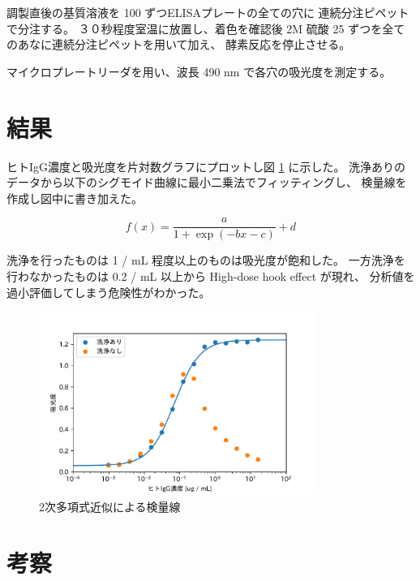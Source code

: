 \documentclass[a4paper]{ltjsarticle}
\begin{document}
調製直後の基質溶液を 100 \uL ずつELISAプレートの全ての穴に
連続分注ピペットで分注する。
３０秒程度室温に放置し、着色を確認後
2M 硫酸 25 \uL ずつを全てのあなに連続分注ピペットを用いて加え、
酵素反応を停止させる。

マイクロプレートリーダを用い、波長 490 nm で各穴の吸光度を測定する。


%
\section{結果}

ヒトIgG濃度と吸光度を片対数グラフにプロットし図 \ref{fig:a-kenryo} に示した。
洗浄ありのデータから以下のシグモイド曲線に最小二乗法でフィッティングし、
検量線を作成し図中に書き加えた。

$$ f(x) = \frac{a}{1 + \exp(-bx - c)} + d $$

洗浄を行ったものは 1 \ug / mL 程度以上のものは吸光度が飽和した。
一方洗浄を行わなかったものは 0.2 \ug / mL 以上から High-dose hook effect が現れ、
分析値を過小評価してしまう危険性がわかった。


\begin{figure}[htbp]
    \begin{center}
        \includegraphics[width=0.8\textwidth]{A-kenryo.pdf}
        \caption{2次多項式近似による検量線}
        \label{fig:a-kenryo}
    \end{center}
\end{figure}

%
\section{考察}
\end{document}
